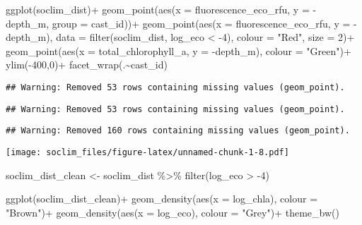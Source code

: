 \documentclass[
]{article}
\newenvironment{Shaded}{\begin{snugshade}}{\end{snugshade}}
\newcommand{\AttributeTok}[1]{\textcolor[rgb]{0.77,0.63,0.00}{#1}}
\newcommand{\DecValTok}[1]{\textcolor[rgb]{0.00,0.00,0.81}{#1}}
\newcommand{\FunctionTok}[1]{\textcolor[rgb]{0.00,0.00,0.00}{#1}}
\newcommand{\NormalTok}[1]{#1}
\newcommand{\OtherTok}[1]{\textcolor[rgb]{0.56,0.35,0.01}{#1}}
\newcommand{\SpecialCharTok}[1]{\textcolor[rgb]{0.00,0.00,0.00}{#1}}
\newcommand{\StringTok}[1]{\textcolor[rgb]{0.31,0.60,0.02}{#1}}
\begin{document}
\begin{Shaded}
\begin{Highlighting}[]
\FunctionTok{ggplot}\NormalTok{(soclim\_dist)}\SpecialCharTok{+}
  \FunctionTok{geom\_point}\NormalTok{(}\FunctionTok{aes}\NormalTok{(}\AttributeTok{x =}\NormalTok{ fluorescence\_eco\_rfu, }\AttributeTok{y =} \SpecialCharTok{{-}}\NormalTok{ depth\_m, }\AttributeTok{group =}\NormalTok{ cast\_id))}\SpecialCharTok{+}
  \FunctionTok{geom\_point}\NormalTok{(}\FunctionTok{aes}\NormalTok{(}\AttributeTok{x =}\NormalTok{ fluorescence\_eco\_rfu, }\AttributeTok{y =} \SpecialCharTok{{-}}\NormalTok{depth\_m), }\AttributeTok{data =} \FunctionTok{filter}\NormalTok{(soclim\_dist, log\_eco }\SpecialCharTok{\textless{}} \SpecialCharTok{{-}}\DecValTok{4}\NormalTok{), }\AttributeTok{colour =} \StringTok{"Red"}\NormalTok{, }\AttributeTok{size =} \DecValTok{2}\NormalTok{)}\SpecialCharTok{+}
  \FunctionTok{geom\_point}\NormalTok{(}\FunctionTok{aes}\NormalTok{(}\AttributeTok{x =}\NormalTok{ total\_chlorophyll\_a, }\AttributeTok{y =} \SpecialCharTok{{-}}\NormalTok{depth\_m), }\AttributeTok{colour =} \StringTok{"Green"}\NormalTok{)}\SpecialCharTok{+}
  \FunctionTok{ylim}\NormalTok{(}\SpecialCharTok{{-}}\DecValTok{400}\NormalTok{,}\DecValTok{0}\NormalTok{)}\SpecialCharTok{+}
  \FunctionTok{facet\_wrap}\NormalTok{(.}\SpecialCharTok{\textasciitilde{}}\NormalTok{cast\_id)}
\end{Highlighting}
\end{Shaded}

\begin{verbatim}
## Warning: Removed 53 rows containing missing values (geom_point).
\end{verbatim}

\begin{verbatim}
## Warning: Removed 53 rows containing missing values (geom_point).
\end{verbatim}

\begin{verbatim}
## Warning: Removed 160 rows containing missing values (geom_point).
\end{verbatim}

\texttt{[image: soclim\_files/figure-latex/unnamed-chunk-1-8.pdf]}

\begin{Shaded}
\begin{Highlighting}[]
\NormalTok{soclim\_dist\_clean }\OtherTok{\textless{}{-}}\NormalTok{ soclim\_dist }\SpecialCharTok{\%\textgreater{}\%} \FunctionTok{filter}\NormalTok{(log\_eco }\SpecialCharTok{\textgreater{}} \SpecialCharTok{{-}}\DecValTok{4}\NormalTok{)}

\FunctionTok{ggplot}\NormalTok{(soclim\_dist\_clean)}\SpecialCharTok{+}
  \FunctionTok{geom\_density}\NormalTok{(}\FunctionTok{aes}\NormalTok{(}\AttributeTok{x =}\NormalTok{ log\_chla), }\AttributeTok{colour =} \StringTok{"Brown"}\NormalTok{)}\SpecialCharTok{+}
  \FunctionTok{geom\_density}\NormalTok{(}\FunctionTok{aes}\NormalTok{(}\AttributeTok{x =}\NormalTok{ log\_eco), }\AttributeTok{colour =} \StringTok{"Grey"}\NormalTok{)}\SpecialCharTok{+}
  \FunctionTok{theme\_bw}\NormalTok{()}
\end{Highlighting}
\end{Shaded}
\end{document}
